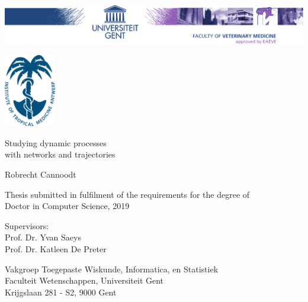
\begin{titlepage}
	\centering
	\includegraphics[width=\textwidth]{fig/DI-eps-converted-to.pdf}
	
	\vspace{1cm}
	
	\includegraphics[width=2.25cm]{fig/ITGlogo_new} 
	\vspace{2.25cm}
	
	{\Huge \textsf{Studying dynamic processes\\with networks and trajectories}}
	
	\vspace{2.25cm}
	
	{\LARGE \textsf{Robrecht Cannoodt}}
	
	\vspace{2.25cm}
	
	{\textsf{Thesis submitted in fulfilment of the requirements for the degree of \\Doctor in Computer Science, 2019}}
	
	\vfill
	
	{\textsf{Supervisors: \\
			Prof. Dr. Yvan Saeys\\Prof. Dr. Katleen De Preter}}
	
	\vfill
	
	{\textsf{Vakgroep Toegepaste Wiskunde, Informatica, en Statistiek\\
			Faculteit Wetenschappen, Universiteit Gent \\
			Krijgslaan 281 - S2, 9000 Gent}}
\end{titlepage}



